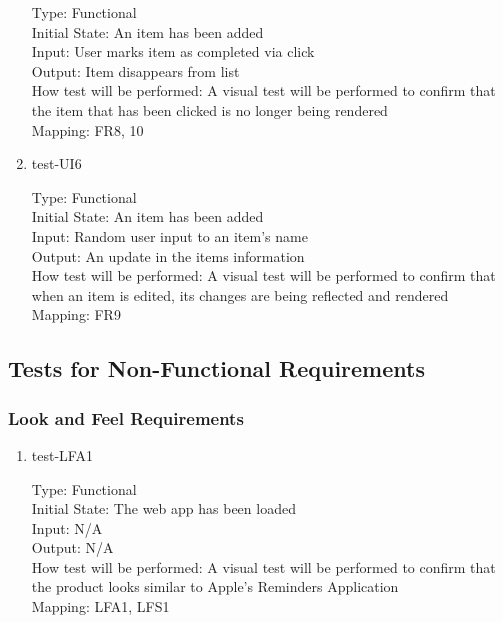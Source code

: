 \documentclass[12pt, titlepage]{article}
\begin{document}
\begin{enumerate}
Type: Functional\\
Initial State: An item has been added\\
Input: User marks item as completed via click\\
Output: Item disappears from list\\
How test will be performed: A visual test will be performed to confirm that the item that has been clicked is no longer being rendered\\
Mapping: FR8, 10

\item{test-UI6\\}

Type: Functional\\
Initial State: An item has been added\\
Input: Random user input to an item’s name\\
Output: An update in the items information\\
How test will be performed: A visual test will be performed to confirm that when an item is edited, its changes are being reflected and rendered\\
Mapping: FR9

\end{enumerate}

\subsection{Tests for Non-Functional Requirements}

\subsubsection{Look and Feel Requirements}

\begin{enumerate}
\item {test-LFA1\\}

Type: Functional\\
Initial State: The web app has been loaded\\
Input: N/A\\
Output: N/A\\
How test will be performed: A visual test will be performed to confirm that the product looks similar to Apple’s Reminders Application\\
Mapping: LFA1, LFS1

\end{enumerate}
\end{document}
